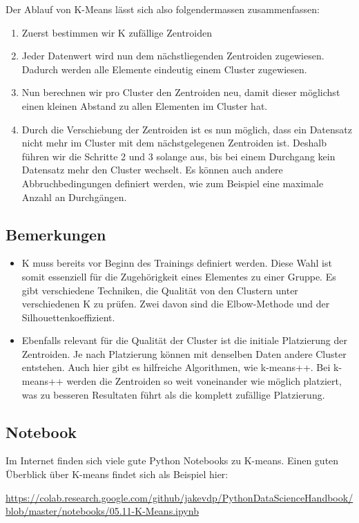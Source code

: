Der Ablauf von K-Means lässt sich also folgendermassen zusammenfassen:
\begin{enumerate}
	\item Zuerst bestimmen wir K zufällige Zentroiden
	\item Jeder Datenwert wird nun dem nächstliegenden Zentroiden zugewiesen. Dadurch werden alle Elemente eindeutig einem Cluster zugewiesen.
	\item Nun berechnen wir pro Cluster den Zentroiden neu, damit dieser möglichst einen kleinen Abstand zu allen Elementen im Cluster hat.
	\item Durch die Verschiebung der Zentroiden ist es nun möglich, dass ein Datensatz nicht mehr im Cluster mit dem nächstgelegenen Zentroiden ist. Deshalb führen wir die Schritte 2 und 3 solange aus, bis bei einem Durchgang kein Datensatz mehr den Cluster wechselt. Es können auch andere Abbruchbedingungen definiert werden, wie zum Beispiel eine maximale Anzahl an Durchgängen.
\end{enumerate}

\subsection{Bemerkungen}
\begin{itemize}
	\item K muss bereits vor Beginn des Trainings definiert werden. Diese Wahl ist somit essenziell für die Zugehörigkeit eines Elementes zu einer Gruppe. Es gibt verschiedene Techniken, die Qualität von den Clustern unter verschiedenen K zu prüfen. Zwei davon sind die Elbow-Methode und der Silhouettenkoeffizient.
	\item Ebenfalls relevant für die Qualität der Cluster ist die initiale Platzierung der Zentroiden. Je nach Platzierung können mit denselben Daten andere Cluster entstehen. Auch hier gibt es hilfreiche Algorithmen, wie k-means++. Bei k-means++ werden die Zentroiden so weit voneinander wie möglich platziert, was zu besseren Resultaten führt als die komplett zufällige Platzierung.
\end{itemize}

\subsection{Notebook}
Im Internet finden sich viele gute Python Notebooks zu K-means. Einen guten Überblick über K-means findet sich als Beispiel hier:

\url{https://colab.research.google.com/github/jakevdp/PythonDataScienceHandbook/blob/master/notebooks/05.11-K-Means.ipynb}

